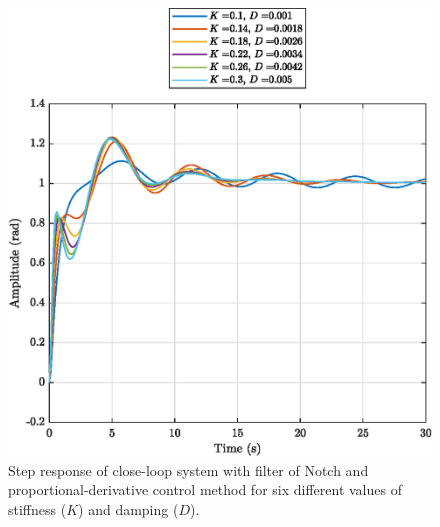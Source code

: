 \begin{figure}[h!]
	\centering
	\includegraphics{images/question3/q3_step_CL_PD_N.eps}
	\caption{Step response of close-loop system with filter of Notch and proportional-derivative control method for six different values of stiffness ($K$) and damping ($D$).}
	\label{fig:q3_step_CL_PD_N}
\end{figure}